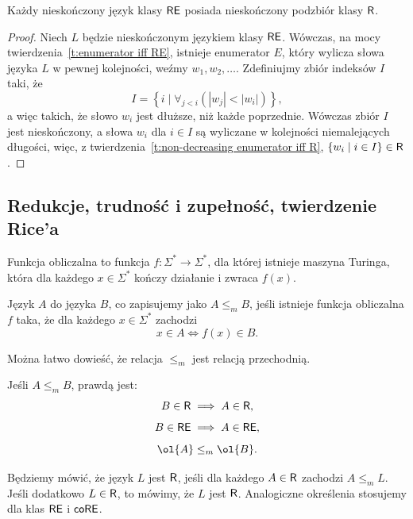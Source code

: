 \begin{theorem}
    Każdy nieskończony język klasy $\textsf{RE}$ posiada nieskończony podzbiór klasy $\textsf{R}$.
\end{theorem}
\begin{proof}
    Niech $L$ będzie nieskończonym językiem klasy $\textsf{RE}$. Wówczas, na mocy twierdzenia~\ref{t:enumerator iff RE}, istnieje enumerator $E$, który wylicza słowa języka $L$ w pewnej kolejności, weźmy $w_1, w_2, \ldots$. Zdefiniujmy zbiór indeksów $I$ taki, że
    \[ I = \left\{i \mid \forall_{j < i} \left(|w_j| < |w_i|\right)\right\}, \]
    a więc takich, że słowo $w_i$ jest dłuższe, niż każde poprzednie.
    Wówczas zbiór $I$ jest nieskończony, a słowa $w_i$ dla $i \in I$ są wyliczane w kolejności niemalejących długości, więc, z twierdzenia~\ref{t:non-decreasing enumerator iff R}, $\{w_i \mid i \in I\} \in \textsf{R}$.
\end{proof}

\subsection{Redukcje, trudność i zupełność, twierdzenie Rice'a}
\begin{definition}
    Funkcja obliczalna to funkcja $f : \Sigma^* \to \Sigma^*$, dla której istnieje maszyna Turinga, która dla każdego $x \in \Sigma^*$ kończy działanie i zwraca $f(x)$.
\end{definition}

\begin{definition}\label{d:many-one reduction}
    Język $A$  do języka $B$, co zapisujemy jako $A \leq_m B$, jeśli istnieje funkcja obliczalna $f$ taka, że dla każdego $x \in \Sigma^*$ zachodzi
\[ x \in A \iff f(x) \in B. \]
\end{definition}

Można łatwo dowieść, że relacja $\leq_m$ jest relacją przechodnią.

\begin{fact}
    Jeśli $A \leq_m B$, prawdą jest:
    \[ B \in \textsf{R} \implies A \in \textsf{R}, \]
    \[ B \in \textsf{RE} \implies A \in \textsf{RE}, \]
    \[ \ol{A} \leq_m \ol{B}. \]
\end{fact}

Będziemy mówić, że język $L$ jest $\textsf{R}$, jeśli dla każdego $A \in \textsf{R}$ zachodzi $A \leq_m L$. Jeśli dodatkowo $L \in \textsf{R}$, to mówimy, że $L$ jest $\textsf{R}$. Analogiczne określenia stosujemy dla klas $\textsf{RE}$ i $\textsf{coRE}$.

